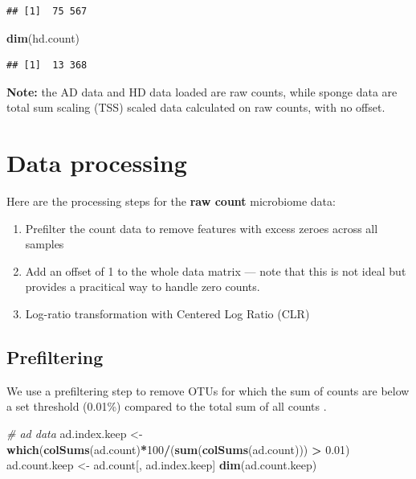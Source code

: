 \documentclass[]{book}
\newenvironment{Shaded}{\begin{snugshade}}{\end{snugshade}}
\newcommand{\KeywordTok}[1]{\textcolor[rgb]{0.13,0.29,0.53}{\textbf{#1}}}
\newcommand{\DecValTok}[1]{\textcolor[rgb]{0.00,0.00,0.81}{#1}}
\newcommand{\FloatTok}[1]{\textcolor[rgb]{0.00,0.00,0.81}{#1}}
\newcommand{\StringTok}[1]{\textcolor[rgb]{0.31,0.60,0.02}{#1}}
\newcommand{\CommentTok}[1]{\textcolor[rgb]{0.56,0.35,0.01}{\textit{#1}}}
\newcommand{\OperatorTok}[1]{\textcolor[rgb]{0.81,0.36,0.00}{\textbf{#1}}}
\newcommand{\NormalTok}[1]{#1}
\providecommand{\tightlist}{%
  \setlength{\itemsep}{0pt}\setlength{\parskip}{0pt}}
\begin{document}
\begin{verbatim}
## [1]  75 567
\end{verbatim}

\begin{Shaded}
\begin{Highlighting}[]
\KeywordTok{dim}\NormalTok{(hd.count)}
\end{Highlighting}
\end{Shaded}

\begin{verbatim}
## [1]  13 368
\end{verbatim}

\textbf{Note:} the AD data and HD data loaded are raw counts, while
sponge data are total sum scaling (TSS) scaled data calculated on raw
counts, with no offset.

\section{Data processing}\label{data-processing}

Here are the processing steps for the \textbf{raw count} microbiome
data:

\begin{enumerate}
\def\labelenumi{\arabic{enumi}.}
\tightlist
\item
  Prefilter the count data to remove features with excess zeroes across
  all samples\\
\item
  Add an offset of 1 to the whole data matrix --- note that this is not
  ideal but provides a pracitical way to handle zero counts.\\
\item
  Log-ratio transformation with Centered Log Ratio (CLR)
\end{enumerate}

\subsection{Prefiltering}\label{prefiltering}

We use a prefiltering step to remove OTUs for which the sum of counts
are below a set threshold (0.01\%) compared to the total sum of all
counts \citep{arumugam2011enterotypes}.

\begin{Shaded}
\begin{Highlighting}[]
\CommentTok{# ad data}
\NormalTok{ad.index.keep <-}\StringTok{ }\KeywordTok{which}\NormalTok{(}\KeywordTok{colSums}\NormalTok{(ad.count)}\OperatorTok{*}\DecValTok{100}\OperatorTok{/}\NormalTok{(}\KeywordTok{sum}\NormalTok{(}\KeywordTok{colSums}\NormalTok{(ad.count))) }\OperatorTok{>}\StringTok{ }\FloatTok{0.01}\NormalTok{)}
\NormalTok{ad.count.keep <-}\StringTok{ }\NormalTok{ad.count[, ad.index.keep]}
\KeywordTok{dim}\NormalTok{(ad.count.keep)}
\end{Highlighting}
\end{Shaded}
\end{document}
